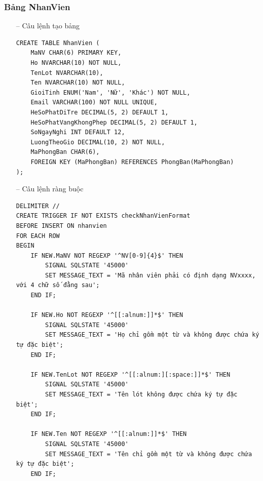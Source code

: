\subsubsection{Bảng NhanVien}
\begin{itemize}
    \item [--] Câu lệnh tạo bảng
    \begin{verbatim}
CREATE TABLE NhanVien (
    MaNV CHAR(6) PRIMARY KEY,
    Ho NVARCHAR(10) NOT NULL,
    TenLot NVARCHAR(10),
    Ten NVARCHAR(10) NOT NULL,
    GioiTinh ENUM('Nam', 'Nữ', 'Khác') NOT NULL,
    Email VARCHAR(100) NOT NULL UNIQUE,
    HeSoPhatDiTre DECIMAL(5, 2) DEFAULT 1,
    HeSoPhatVangKhongPhep DECIMAL(5, 2) DEFAULT 1,
    SoNgayNghi INT DEFAULT 12,
    LuongTheoGio DECIMAL(10, 2) NOT NULL,
    MaPhongBan CHAR(6),
    FOREIGN KEY (MaPhongBan) REFERENCES PhongBan(MaPhongBan)
);
    \end{verbatim}
    \newpage
    \item [--] Câu lệnh ràng buộc
    \begin{verbatim}
DELIMITER //
CREATE TRIGGER IF NOT EXISTS checkNhanVienFormat
BEFORE INSERT ON nhanvien
FOR EACH ROW
BEGIN
    IF NEW.MaNV NOT REGEXP '^NV[0-9]{4}$' THEN
        SIGNAL SQLSTATE '45000' 
        SET MESSAGE_TEXT = 'Mã nhân viên phải có định dạng NVxxxx, với 4 chữ số đằng sau';
    END IF;

    IF NEW.Ho NOT REGEXP '^[[:alnum:]]*$' THEN 
        SIGNAL SQLSTATE '45000'
        SET MESSAGE_TEXT = 'Họ chỉ gồm một từ và không được chứa ký tự đặc biệt';
    END IF;

    IF NEW.TenLot NOT REGEXP '^[[:alnum:][:space:]]*$' THEN 
        SIGNAL SQLSTATE '45000'
        SET MESSAGE_TEXT = 'Tên lót không được chứa ký tự đặc biệt';
    END IF;

    IF NEW.Ten NOT REGEXP '^[[:alnum:]]*$' THEN 
        SIGNAL SQLSTATE '45000'
        SET MESSAGE_TEXT = 'Tên chỉ gồm một từ và không được chứa ký tự đặc biệt';
    END IF;


\end{verbatim}
\end{itemize}
